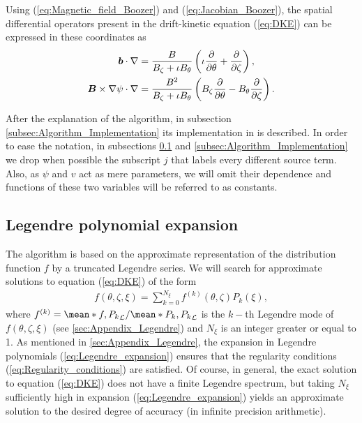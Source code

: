  Using (\ref{eq:Magnetic_field_Boozer}) and (\ref{eq:Jacobian_Boozer}), the spatial differential operators present in the drift-kinetic equation (\ref{eq:DKE}) can be expressed in these coordinates as
 \begin{align}
 	\vb*{b} \cdot \nabla & = 
 	\frac{B}{B_\zeta + \iota B_\theta}
 	\left(
 	\iota \pdv{\theta}
 	+ 
 	\pdv{\zeta} 
 	\right), \label{eq:Parallel_streaming_spatial_operator}
 	\\
 	\vb*{B}\times\nabla\psi \cdot \nabla & = 
 	\frac{B^2}{B_\zeta + \iota B_\theta}
 	\left(
 	B_\zeta \pdv{\theta}
 	-
 	B_\theta \pdv{\zeta}
 	\right). \label{eq:ExB_spatial_operator}
 \end{align}
  
 
 
 
 After the explanation of the algorithm, in subsection \ref{subsec:Algorithm_Implementation} its implementation in {\MONKES} is described. In order to ease the notation, in subsections \ref{subsec:Legendre_expansion} and \ref{subsec:Algorithm_Implementation} we drop when possible the subscript $j$ that labels every different source term.  Also, as $\psi$ and $v$ act as mere parameters, we will omit their dependence and functions of these two variables will be referred to as constants. 
 
 \subsection{Legendre polynomial expansion}\label{subsec:Legendre_expansion}
 The algorithm is based on the approximate representation of the distribution function $f$ by a truncated Legendre series. We will search for approximate solutions to equation (\ref{eq:DKE}) of the form
 \begin{align}
 	f(\theta,\zeta,\xi) = \sum_{k=0}^{N_\xi} f^{(k)}(\theta,\zeta) P_k(\xi), \label{eq:Legendre_expansion}
 \end{align} 
where $f^{(k)} = \mean*{f,P_k}_\Lorentz / \mean*{P_k,P_k}_\Lorentz$ is the $k-$th Legendre mode of $f(\theta,\zeta,\xi)$ (see \ref{sec:Appendix_Legendre}) and $N_\xi$ is an integer greater or equal to 1. As mentioned in \ref{sec:Appendix_Legendre}, the expansion in Legendre polynomials (\ref{eq:Legendre_expansion}) ensures that the regularity conditions (\ref{eq:Regularity_conditions}) are satisfied. Of course, in general, the exact solution to equation (\ref{eq:DKE}) does not have a finite Legendre spectrum, but taking $N_\xi$ sufficiently high in expansion (\ref{eq:Legendre_expansion}) yields an approximate solution to the desired degree of accuracy (in infinite precision arithmetic).  

